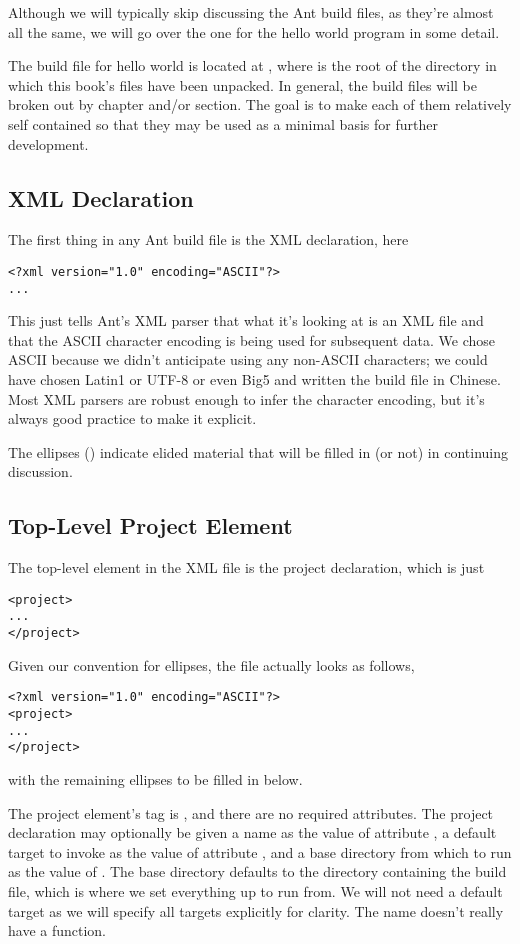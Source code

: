 Although we will typically skip discussing the Ant build files,
as they're almost all the same, we will go over the one for the
hello world program in some detail.  

The build file for hello world is located at
, where \relpath{} is the root of the
directory in which this book's files have been unpacked.  In general, the
build files will be broken out by chapter and/or section.  The goal is
to make each of them relatively self contained so that they may be
used as a minimal basis for further development.

\subsection{XML Declaration}

The first thing in any Ant build file is the XML declaration, here
%
\begin{verbatim}
<?xml version="1.0" encoding="ASCII"?>
...
\end{verbatim}
%
This just tells Ant's XML parser that what it's looking at is an XML
file and that the ASCII character encoding is being used for
subsequent data.  We chose ASCII because we didn't anticipate using
any non-ASCII characters; we could have chosen Latin1 or UTF-8 or even
Big5 and written the build file in Chinese.  Most XML parsers are
robust enough to infer the character encoding, but it's always good
practice to make it explicit.

The ellipses () indicate elided material that will be
filled in (or not) in continuing discussion.  

\subsection{Top-Level Project Element} 

The top-level element in the XML file is the project declaration,
which is just
%
\begin{verbatim}
<project>
...
</project>
\end{verbatim}
%
Given our convention for ellipses, the file actually looks as follows,

\begin{verbatim}
<?xml version="1.0" encoding="ASCII"?>
<project>
...
</project>
\end{verbatim}
%
with the remaining ellipses to be filled in below.

The project element's tag is , and there are no required
attributes.  The project declaration may optionally be given a name as
the value of attribute , a default target to invoke as the
value of attribute , and a base directory from which to
run as the value of .  The base directory defaults
to the directory containing the build file, which is where we set
everything up to run from.  We will not need a default target as we
will specify all targets explicitly for clarity.  The name doesn't
really have a function.

